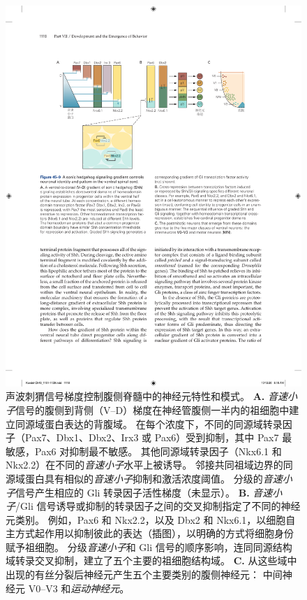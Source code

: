 \begin{figure}[htbp]
	\centering
	\includegraphics[width=1.0\linewidth]{chap45/fig_45_9}
	\caption{声波刺猬信号梯度控制腹侧脊髓中的神经元特性和模式。
		\textbf{A.} \textit{音速小子}信号的腹侧到背侧（V–D）梯度在神经管腹侧一半内的祖细胞中建立同源域蛋白表达的背腹域。
		在每个浓度下，不同的同源域转录因子（Pax7、Dbx1、Dbx2、Irx3 或 Pax6）受到抑制，其中 Pax7 最敏感，Pax6 对抑制最不敏感。
		其他同源域转录因子（Nkx6.1 和 Nkx2.2）在不同的\textit{音速小子}水平上被诱导。
		邻接共同祖域边界的同源域蛋白具有相似的\textit{音速小子}抑制和激活浓度阈值。
		分级的\textit{音速小子}信号产生相应的 Gli 转录因子活性梯度（未显示）。
		\textbf{B.} \textit{音速小子}/Gli 信号诱导或抑制的转录因子之间的交叉抑制指定了不同的神经元类别。
		例如，Pax6 和 Nkx2.2，以及 Dbx2 和 Nkx6.1，以细胞自主方式起作用以抑制彼此的表达（插图），以明确的方式将细胞身份赋予祖细胞。
		分级\textit{音速小子}和 Gli 信号的顺序影响，连同同源结构域转录交叉抑制，建立了五个主要的祖细胞结构域。
		\textbf{C.} 从这些域中出现的有丝分裂后神经元产生五个主要类别的腹侧神经元：
		中间神经元 V0–V3 和\textit{运动神经元}。}
	\label{fig:45_9}
\end{figure}


